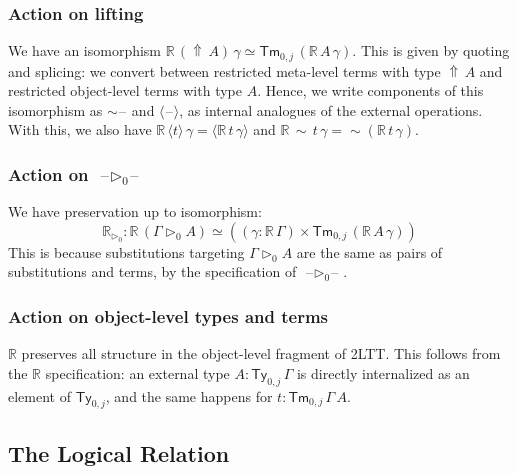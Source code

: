 \documentclass[acmsmall,anonymous,review]{acmart}
\newcommand{\msf}[1]{\mathsf{#1}}
\newcommand{\mbb}[1]{\mathbb{#1}}
\newcommand{\ext}{\triangleright}
\newcommand{\Lift}{{\Uparrow}}
\newcommand{\spl}{{\sim}}
\newcommand{\qut}[1]{\langle #1\rangle}
\newcommand{\Ty}{\msf{Ty}}
\newcommand{\Tm}{\msf{Tm}}
\newcommand{\blank}{{\mathord{\hspace{1pt}\text{--}\hspace{1pt}}}}
\newcommand{\re}{\mbb{R}}
\theoremstyle{remark}
\begin{document}
\subsubsection{Action on lifting} We have an isomorphism $\re\,(\Lift\,A)\,\gamma \simeq
\Tm_{0,j}\,(\re\,A\,\gamma)$. This is given by quoting and splicing: we convert
between restricted meta-level terms with type $\Lift\,A$ and restricted
object-level terms with type $A$. Hence, we write components of this isomorphism
as $\spl\blank$ and $\qut{\blank}$, as internal analogues of the external
operations. With this, we also have $\re\,\qut{t}\,\gamma =
\qut{\re\,t\,\gamma}$ and $\re\,\spl\,t\,\gamma = \spl(\re\,t\,\gamma)$.

\subsubsection{Action on $\blank\ext_0\blank$} We have preservation up to isomorphism:
\[
  \re_{\ext_0} : \re\,(\Gamma \ext_0 A) \simeq ((\gamma : \re\,\Gamma)\times \Tm_{0,j}\,(\re\,A\,\gamma))
\]
This is because substitutions targeting $\Gamma \ext_0 A$ are the same as
pairs of substitutions and terms, by the specification of $\blank\!\ext_0\!\blank$.

\subsubsection{Action on object-level types and terms} $\re$ preserves all structure
in the object-level fragment of 2LTT. This follows from the $\re$ specification:
an external type $A : \Ty_{0,j}\,\Gamma$ is directly internalized as an element
of $\Ty_{0,j}$, and the same happens for $t : \Tm_{0,j}\,\Gamma\,A$.


\subsection{The Logical Relation}
\end{document}
